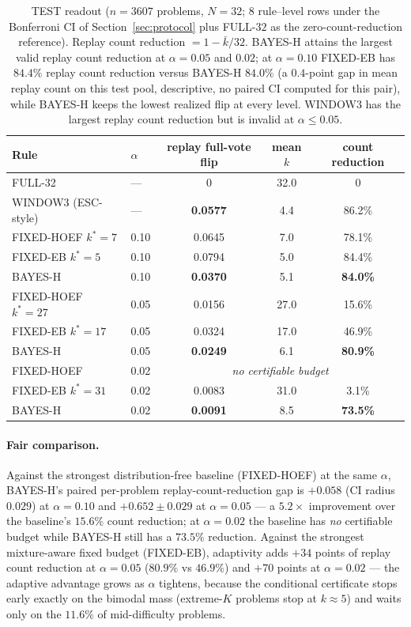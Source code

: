 \documentclass{article}
\theoremstyle{definition}
\theoremstyle{remark}
\begin{document}
\begin{table}[t]
\centering\small
\caption{TEST readout ($n=3607$ problems, $N=32$; $8$ rule--level rows
under the Bonferroni CI of Section~\ref{sec:protocol} plus FULL-$32$ as the
zero-count-reduction reference). Replay count reduction $=1-\bar k/32$.
BAYES-H attains the largest valid replay count reduction at $\alpha=0.05$ and $0.02$;
at $\alpha=0.10$ FIXED-EB has $84.4\%$ replay count reduction versus BAYES-H $84.0\%$ (a
$0.4$-point gap in mean replay count on this test pool, descriptive, no paired
CI computed for this pair), while BAYES-H keeps the lowest realized
flip at every level.
WINDOW3 has the largest replay count reduction but is invalid at $\alpha\le0.05$.}
\label{tab:main}
\begin{tabular}{llccc}
\toprule
Rule & $\alpha$ & replay full-vote flip & mean $k$ & count reduction \\
\midrule
FULL-32 & --- & 0 & 32.0 & 0 \\
WINDOW3 (ESC-style) & --- & \textbf{0.0577} & 4.4 & 86.2\% \\
\midrule
FIXED-HOEF $k^*{=}7$  & 0.10 & 0.0645 & 7.0 & 78.1\% \\
FIXED-EB   $k^*{=}5$  & 0.10 & 0.0794 & 5.0 & 84.4\% \\
BAYES-H               & 0.10 & \textbf{0.0370} & 5.1 & \textbf{84.0\%} \\
\midrule
FIXED-HOEF $k^*{=}27$ & 0.05 & 0.0156 & 27.0 & 15.6\% \\
FIXED-EB   $k^*{=}17$ & 0.05 & 0.0324 & 17.0 & 46.9\% \\
BAYES-H               & 0.05 & \textbf{0.0249} & 6.1 & \textbf{80.9\%} \\
\midrule
FIXED-HOEF & 0.02 & \multicolumn{3}{c}{\emph{no certifiable budget}} \\
FIXED-EB   $k^*{=}31$ & 0.02 & 0.0083 & 31.0 & 3.1\% \\
BAYES-H               & 0.02 & \textbf{0.0091} & 8.5 & \textbf{73.5\%} \\
\bottomrule
\end{tabular}
\end{table}

\paragraph{Fair comparison.} Against the strongest distribution-free baseline
(FIXED-HOEF) at the same $\alpha$, BAYES-H's paired per-problem replay-count-reduction gap is
$+0.058$ (CI radius $0.029$) at $\alpha=0.10$ and $+0.652\pm0.029$ at
$\alpha=0.05$ --- a $5.2\times$ improvement over the baseline's $15.6\%$
count reduction; at $\alpha=0.02$ the baseline has \emph{no} certifiable budget while
BAYES-H still has a $73.5\%$ reduction. Against the strongest mixture-aware fixed budget
(FIXED-EB), adaptivity adds $+34$ points of replay count reduction at $\alpha=0.05$
($80.9\%$ vs $46.9\%$) and $+70$ points at $\alpha=0.02$ --- the adaptive
advantage grows as $\alpha$ tightens, because the conditional certificate
stops early exactly on the bimodal mass (extreme-$K$ problems stop at
$k\approx5$) and waits only on the $11.6\%$ of mid-difficulty problems.
\end{document}
